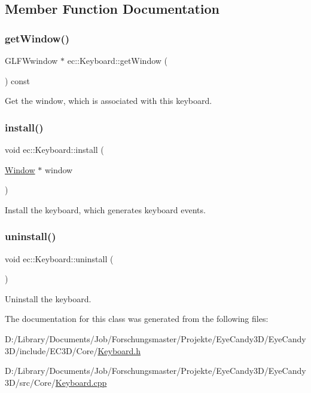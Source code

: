 \subsection{Member Function Documentation}
\mbox{\label{classec_1_1_keyboard_ad6b17bd2f2853def1e6ec21fadd9b658}} 
\subsubsection{\texorpdfstring{get\+Window()}{getWindow()}}
{\footnotesize\ttfamily G\+L\+F\+Wwindow $\ast$ ec\+::\+Keyboard\+::get\+Window (\begin{DoxyParamCaption}{ }\end{DoxyParamCaption}) const}

Get the window, which is associated with this keyboard. \mbox{\label{classec_1_1_keyboard_af792a3b8226096510f6dfecc57697f8e}} 
\subsubsection{\texorpdfstring{install()}{install()}}
{\footnotesize\ttfamily void ec\+::\+Keyboard\+::install (\begin{DoxyParamCaption}\item[{\mbox{\hyperlink{classec_1_1_window}{Window}} $\ast$}]{window }\end{DoxyParamCaption})}

Install the keyboard, which generates keyboard events. \mbox{\label{classec_1_1_keyboard_a1e60401ed958ec3d94a77b1dda9f44e8}} 
\subsubsection{\texorpdfstring{uninstall()}{uninstall()}}
{\footnotesize\ttfamily void ec\+::\+Keyboard\+::uninstall (\begin{DoxyParamCaption}{ }\end{DoxyParamCaption})}

Uninstall the keyboard. 

The documentation for this class was generated from the following files\+:\begin{DoxyCompactItemize}
\item 
D\+:/\+Library/\+Documents/\+Job/\+Forschungsmaster/\+Projekte/\+Eye\+Candy3\+D/\+Eye\+Candy3\+D/include/\+E\+C3\+D/\+Core/\mbox{\hyperlink{_keyboard_8h}{Keyboard.\+h}}\item 
D\+:/\+Library/\+Documents/\+Job/\+Forschungsmaster/\+Projekte/\+Eye\+Candy3\+D/\+Eye\+Candy3\+D/src/\+Core/\mbox{\hyperlink{_keyboard_8cpp}{Keyboard.\+cpp}}\end{DoxyCompactItemize}
